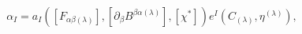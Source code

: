 \begin{equation}
\alpha _{I}=a_{I}\left( \left[ F_{\alpha \beta (\lambda )}\right] ,\left[
\partial _{\beta }B^{\beta \alpha (\lambda )}\right] ,\left[ \chi
^{*}\right] \right) e^{I}\left( C_{(\lambda )},\eta ^{(\lambda )}\right) ,
\label{cin20}
\end{equation}

